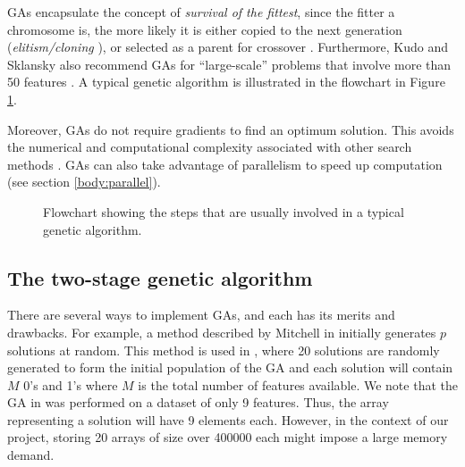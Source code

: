 \documentclass[12pt, twoside, a4paper]{report}
\begin{document}
GAs encapsulate the concept of \textit{survival of the fittest}, since the fitter a chromosome is, the more likely it is either copied to the next generation (\textit{elitism/cloning} \cite{RefWorks:202, RefWorks:212, RefWorks:227}), or selected as a parent for crossover \cite{RefWorks:209}. Furthermore, Kudo and Sklansky also recommend GAs for ``large-scale'' problems that involve more than 50 features \cite{RefWorks:210}. A typical genetic algorithm is illustrated in the flowchart in Figure \ref{bg:fs:ga:flowchart}.

Moreover, GAs do not require gradients to find an optimum solution. This avoids the numerical and computational complexity associated with other search methods \cite{RefWorks:242}. GAs can also take advantage of parallelism to speed up computation (see section \ref{body:parallel}).

\begin{figure}
\centering
{}
\caption{Flowchart showing the steps that are usually involved in a typical genetic algorithm.}
\label{bg:fs:ga:flowchart}
\end{figure}

\subsection{The two-stage genetic algorithm}\label{bg:ga:twostage}
There are several ways to implement GAs, and each has its merits and drawbacks. For example, a method described by Mitchell in \cite{RefWorks:205} initially generates $p$ solutions at random. This method is used in \cite{RefWorks:206}, where 20 solutions are randomly generated to form the initial population of the GA and each solution will contain $M$ 0's and 1's where $M$ is the total number of features available. We note that the GA in \cite{RefWorks:206} was performed on a dataset of only 9 features. Thus, the array representing a solution will have 9 elements each. However, in the context of our project, storing 20 arrays of size over 400000 each might impose a large memory demand.
\end{document}
